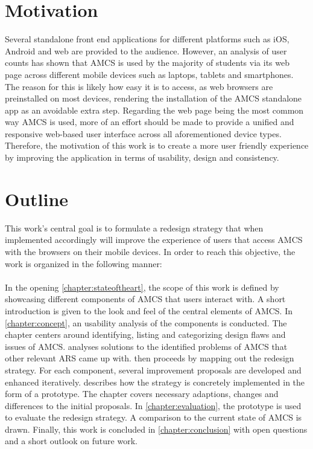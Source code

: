 \section{Motivation}
Several standalone front end applications for different platforms such as iOS, Android and web are provided to the audience. However, an analysis of user counts has shown that AMCS is used by the majority of students via its web page across different mobile devices such as laptops, tablets and smartphones.
The reason for this is likely how easy it is to access, as web browsers are preinstalled on most devices, rendering the installation of the AMCS standalone app as an avoidable extra step.
\newline
\newline 
Regarding the web page being the most common way AMCS is used, more of an effort should be made to provide a unified and responsive web-based user interface across all aforementioned device types.
\newline
\newline 
Therefore, the motivation of this work is to create a more user friendly experience by improving the application in terms of usability, design and consistency.
\section{Outline}
\label{section:intro:objective}
This work's central goal is to formulate a redesign strategy that when implemented accordingly will improve the experience of users that access AMCS with the browsers on their mobile devices. In order to reach this objective, the work is organized in the following manner:
\\
\\
In the opening  \cref{chapter:stateoftheart}, the scope of this work is defined by showcasing different components of AMCS that users interact with. A short introduction is given to the look and feel of the central elements of AMCS.
In  \cref{chapter:concept}, an usability analysis of the components is conducted. The chapter centers around identifying, listing and categorizing design flaws and issues of AMCS. 
 analyses solutions to the identified problems of AMCS that other relevant ARS came up with.
 then proceeds by mapping out the redesign strategy. For each component, several improvement proposals are developed and enhanced iteratively. 
 describes how the strategy is concretely implemented in the form of a prototype. The chapter covers necessary adaptions, changes and differences to the initial proposals.
In \cref{chapter:evaluation}, the prototype is used to evaluate the redesign strategy. A comparison to the current state of AMCS is drawn.
Finally, this work is concluded in \cref{chapter:conclusion} with open questions and a short outlook on future work.